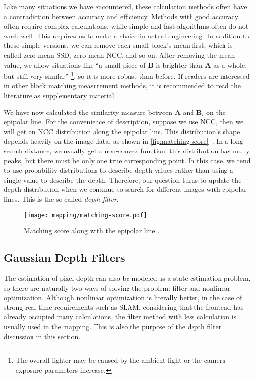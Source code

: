 Like many situations we have encountered, these calculation methods often have a contradiction between accuracy and efficiency. Methods with good accuracy often require complex calculations, while simple and fast algorithms often do not work well. This requires us to make a choice in actual engineering. In addition to these simple versions, we can remove each small block's mean first, which is called zero-mean SSD, zero mean NCC, and so on. After removing the mean value, we allow situations like ``a small piece of $\mathbf{B}$ is brighter than $\mathbf{A}$ as a whole, but still very similar'' \footnote{The overall lighter may be caused by the ambient light or the camera exposure parameters increase. }, so it is more robust than before. If readers are interested in other block matching measurement methods, it is recommended to read the literature \cite{stereo-matching-website, Hirschmuller2007} as supplementary material.

We have now calculated the similarity measure between $\mathbf{A}$ and $\mathbf{B}_i$ on the epipolar line. For the convenience of description, suppose we use NCC, then we will get an NCC distribution along the epipolar line. This distribution's shape depends heavily on the image data, as shown in \autoref{fig:matching-score}~. In a long search distance, we usually get a non-convex function: this distribution has many peaks, but there must be only one true corresponding point. In this case, we tend to use probability distributions to describe depth values rather than using a single value to describe the depth. Therefore, our question turns to update the depth distribution when we continue to search for different images with epipolar lines. This is the so-called \textit{depth filter}.

\begin{figure}[!htp]
	\centering
	\texttt{[image: mapping/matching-score.pdf]}
	\caption{Matching score along with the epipolar line \cite{Vogiatzis2011}.}
	\label{fig:matching-score}
\end{figure}

\subsection{Gaussian Depth Filters}
The estimation of pixel depth can also be modeled as a state estimation problem, so there are naturally two ways of solving the problem: filter and nonlinear optimization. Although nonlinear optimization is literally better, in the case of strong real-time requirements such as SLAM, considering that the frontend has already occupied many calculations, the filter method with less calculation is usually used in the mapping. This is also the purpose of the depth filter discussion in this section.

